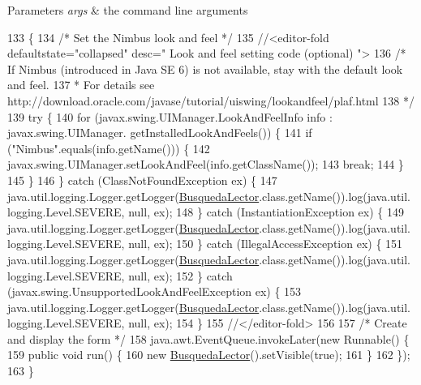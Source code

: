 \begin{DoxyParams}{Parameters}
{\em args} & the command line arguments \\
\hline
\end{DoxyParams}

\begin{DoxyCode}
133                                            \{
134         \textcolor{comment}{/* Set the Nimbus look and feel */}
135         \textcolor{comment}{//<editor-fold defaultstate="collapsed" desc=" Look and feel setting code (optional) ">}
136         \textcolor{comment}{/* If Nimbus (introduced in Java SE 6) is not available, stay with the default look and feel.}
137 \textcolor{comment}{         * For details see http://download.oracle.com/javase/tutorial/uiswing/lookandfeel/plaf.html }
138 \textcolor{comment}{         */}
139         \textcolor{keywordflow}{try} \{
140             \textcolor{keywordflow}{for} (javax.swing.UIManager.LookAndFeelInfo info : javax.swing.UIManager.
      getInstalledLookAndFeels()) \{
141                 \textcolor{keywordflow}{if} (\textcolor{stringliteral}{"Nimbus"}.equals(info.getName())) \{
142                     javax.swing.UIManager.setLookAndFeel(info.getClassName());
143                     \textcolor{keywordflow}{break};
144                 \}
145             \}
146         \} \textcolor{keywordflow}{catch} (ClassNotFoundException ex) \{
147             java.util.logging.Logger.getLogger(\mbox{\hyperlink{class_interfaz_package_1_1_busqueda_lector_a2694b304cc19f63494b4a46e0501063d}{BusquedaLector}}.class.getName()).log(java.util.
      logging.Level.SEVERE, null, ex);
148         \} \textcolor{keywordflow}{catch} (InstantiationException ex) \{
149             java.util.logging.Logger.getLogger(\mbox{\hyperlink{class_interfaz_package_1_1_busqueda_lector_a2694b304cc19f63494b4a46e0501063d}{BusquedaLector}}.class.getName()).log(java.util.
      logging.Level.SEVERE, null, ex);
150         \} \textcolor{keywordflow}{catch} (IllegalAccessException ex) \{
151             java.util.logging.Logger.getLogger(\mbox{\hyperlink{class_interfaz_package_1_1_busqueda_lector_a2694b304cc19f63494b4a46e0501063d}{BusquedaLector}}.class.getName()).log(java.util.
      logging.Level.SEVERE, null, ex);
152         \} \textcolor{keywordflow}{catch} (javax.swing.UnsupportedLookAndFeelException ex) \{
153             java.util.logging.Logger.getLogger(\mbox{\hyperlink{class_interfaz_package_1_1_busqueda_lector_a2694b304cc19f63494b4a46e0501063d}{BusquedaLector}}.class.getName()).log(java.util.
      logging.Level.SEVERE, null, ex);
154         \}
155         \textcolor{comment}{//</editor-fold>}
156 
157         \textcolor{comment}{/* Create and display the form */}
158         java.awt.EventQueue.invokeLater(\textcolor{keyword}{new} Runnable() \{
159             \textcolor{keyword}{public} \textcolor{keywordtype}{void} run() \{
160                 \textcolor{keyword}{new} \mbox{\hyperlink{class_interfaz_package_1_1_busqueda_lector_a2694b304cc19f63494b4a46e0501063d}{BusquedaLector}}().setVisible(\textcolor{keyword}{true});
161             \}
162         \});
163     \}
\end{DoxyCode}



